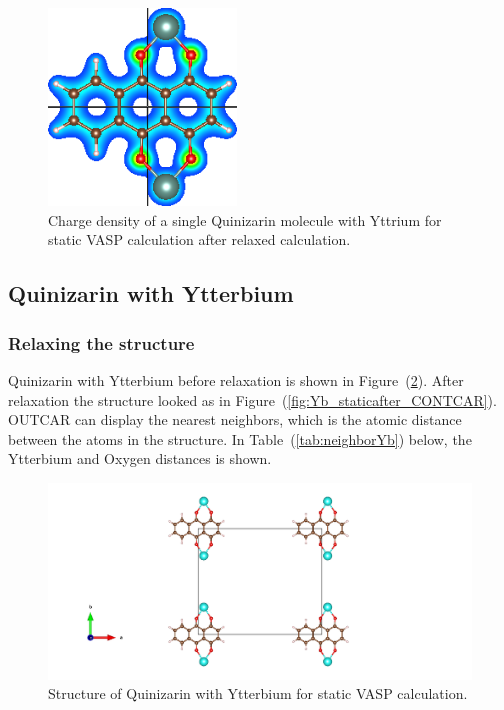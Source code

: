 \documentclass{article}
\begin{document}
      \begin{figure}[H]
        \centering
        \includegraphics[width = 5cm]{../fig/Y_staticafter_CHGDENSITY.png}
        \caption{Charge density of a single Quinizarin molecule with Yttrium for static VASP calculation after relaxed calculation. }
        \label{fig:Y_staticafter_CHGDENSITY}
      \end{figure}

      \vspace{1cm}

  \subsection{Quinizarin with Ytterbium}

    \subsubsection{Relaxing the structure}

      Quinizarin with Ytterbium before relaxation is shown in Figure~(\ref{fig:Yb_staticbefore_CONTCAR}). After relaxation the structure looked as in Figure~(\ref{fig:Yb_staticafter_CONTCAR}). \\

      OUTCAR can display the nearest neighbors, which is the atomic distance between the atoms in the structure. In Table~(\ref{tab:neighborYb}) below, the Ytterbium and Oxygen distances is shown. \\

      \begin{figure}[H]
        \centering
        \includegraphics[width = \textwidth]{../fig/Yb_staticbefore_CONTCAR.png}
        \caption{Structure of Quinizarin with Ytterbium for static VASP calculation. }
        \label{fig:Yb_staticbefore_CONTCAR}
      \end{figure}
\end{document}
